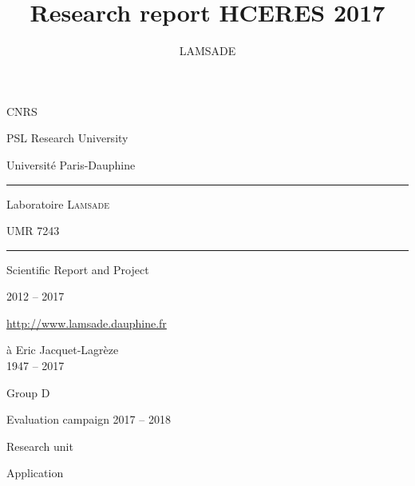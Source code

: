 \documentclass[version=last, pagesize, twoside=semi, DIV=calc, 12pt, a4paper, french, english, bibliography=totoc]{scrartcl}
\begin{document}
\title{Research report HCERES 2017}
\author{LAMSADE}

\begin{titlepage}
	\centering
	\vspace*{\baselineskip} %
	{
		\LARGE 
		CNRS
		
		PSL Research University
		
		Université Paris-Dauphine
	
		\vspace{7em}
		
		\rule{15em}{1.6pt}
		\vspace{0.5\baselineskip}
	
		Laboratoire \textsc{Lamsade}
		
		UMR 7243
		\vspace{-0.5\baselineskip}

		\rule{15em}{1.6pt}
	
		\vspace{7em}
	
		Scientific Report and Project
		
		2012 -- 2017
		
		\vfill
		
	}
	\url{http://www.lamsade.dauphine.fr}
	
\end{titlepage} 

\pagestyle{empty}

\vspace*{5cm}
{\flushright%
	à Eric Jacquet-Lagrèze\\
	1947 -- 2017\par
}
\newpage

\renewcommand{\baselinestretch}{0.97}\normalsize
\tableofcontents
\renewcommand{\baselinestretch}{1.0}\normalsize
\newpage
\null
\newpage
\pagestyle{plain}
\setcounter{page}{1}


{%
	\centering%
		\colorbox{redh}{%
			\begin{minipage}{12.75cm}
				\begin{center}
					\color{white}
					\Large \sffamily%
						\vspace{1em}
						Group D\par
						Evaluation campaign 2017 – 2018\par
						\vspace{1em}
						Research unit\par
						\vspace{1em}
						Application
				\end{center}
			\end{minipage}%
		}
	\par
}
\end{document}
